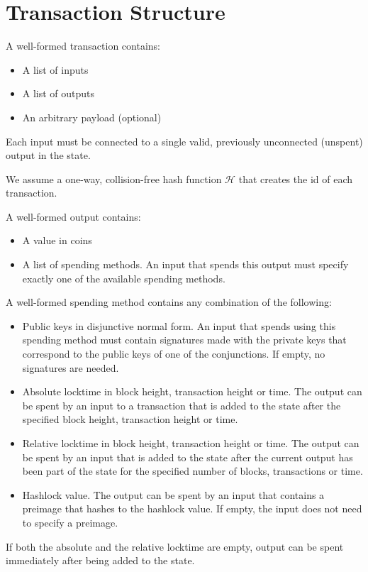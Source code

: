 \section{Transaction Structure}
  \label{appendix:txstructure}
  A well-formed transaction contains:
  \begin{itemize}
    \item A list of inputs
    \item A list of outputs
    \item An arbitrary payload (optional)
  \end{itemize}
  Each input must be connected to a single valid, previously unconnected
  (unspent) output in the state.

  We assume a one-way, collision-free hash function $\mathcal{H}$ that creates
  the id of each transaction.

  A well-formed output contains:
  \begin{itemize}
    \item A value in coins
    \item A list of spending methods. An input that spends this output must
    specify exactly one of the available spending methods.
  \end{itemize}

  A well-formed spending method contains any combination of the following:
  \begin{itemize}
    \item Public keys in disjunctive normal form. An input that spends using
    this spending method must contain signatures made with the private keys that
    correspond to the public keys of one of the conjunctions. If empty, no
    signatures are needed.
    \item Absolute locktime in block height, transaction height or time. The
    output can be spent by an input to a transaction that is added to the state
    after the specified block height, transaction height or time.
    \item Relative locktime in block height, transaction height or time. The
    output can be spent by an input that is added to the state after the current
    output has been part of the state for the specified number of blocks,
    transactions or time.
    \item Hashlock value. The output can be spent by an input that contains a
    preimage that hashes to the hashlock value. If empty, the input does not
    need to specify a preimage.
  \end{itemize}
  If both the absolute and the relative locktime are empty, output can be spent
  immediately after being added to the state.

